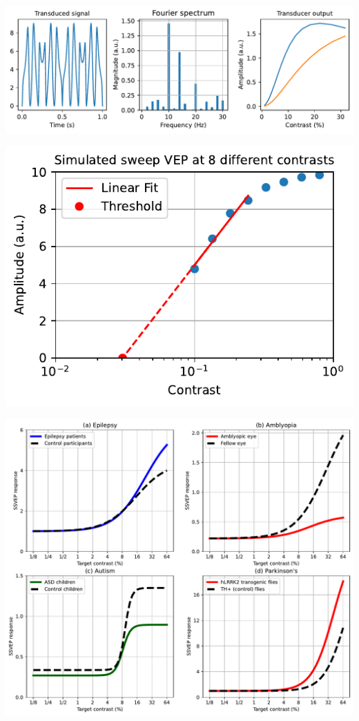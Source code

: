 \documentclass[
  letterpaper,
  DIV=11,
  numbers=noendperiod]{scrartcl}
\begin{document}
\includegraphics{review_files/figure-pdf/cell-6-output-1.pdf}

\includegraphics{review_files/figure-pdf/cell-7-output-1.pdf}

\includegraphics{review_files/figure-pdf/cell-8-output-1.pdf}
\end{document}
